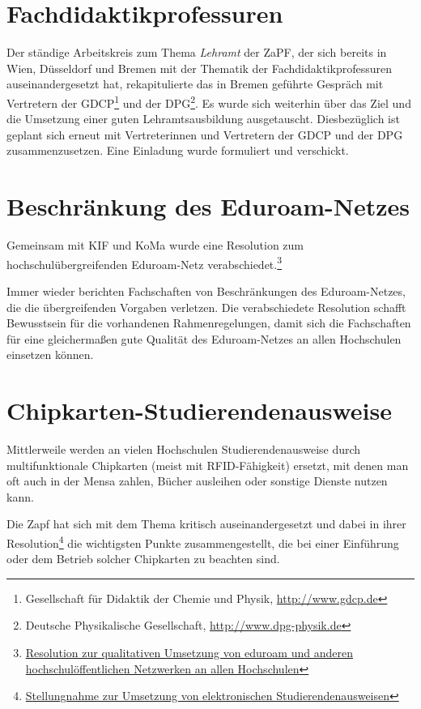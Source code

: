 \section*{Fachdidaktikprofessuren}

Der  ständige  Arbeitskreis zum Thema \emph{Lehramt} der ZaPF, der sich bereits 
in Wien, Düsseldorf und Bremen mit  der Thematik der Fachdidaktikprofessuren
auseinandergesetzt hat, rekapitulierte das in Bremen geführte Gespräch mit
Vertretern der GDCP\footnote{Gesellschaft für Didaktik der Chemie und Physik,
\href{http://www.gdcp.de}{\url{http://www.gdcp.de}}} und der DPG\footnote{Deutsche Physikalische Gesellschaft, \href{http://www.dpg-physik.de}{\url{http://www.dpg-physik.de}}}.
Es wurde sich weiterhin über  das Ziel und die Umsetzung einer guten
Lehramtsausbildung ausgetauscht.  Diesbezüglich ist geplant sich erneut mit
Vertreterinnen und Vertretern der GDCP und der DPG zusammenzusetzen.
Eine Einladung wurde formuliert und verschickt.


\section*{Beschränkung des Eduroam-Netzes}

Gemeinsam mit KIF und KoMa wurde eine Resolution zum hochschulübergreifenden
Eduroam-Netz verabschiedet.\footnote{\href{https://vmp.ethz.ch/zapfwiki/images/2/27/Resolution\_SoSe15\_Netzneutralit\%C3\%A4t\_in\_Universit\%C3\%A4tsnetzen.pdf}{Resolution zur qualitativen Umsetzung von eduroam und anderen hochschulöffentlichen Netzwerken an allen Hochschulen}}

Immer wieder berichten Fachschaften von Beschränkungen des Eduroam-Netzes, die
die übergreifenden Vorgaben verletzen. Die verabschiedete Resolution schafft 
Bewusstsein für die vorhandenen Rahmenregelungen, damit sich die Fachschaften
für eine gleichermaßen gute Qualität des Eduroam-Netzes an allen Hochschulen
einsetzen können.

\section*{Chipkarten-Studierendenausweise}

Mittlerweile werden an vielen Hochschulen Studierendenausweise durch
multifunktionale Chipkarten (meist mit RFID-Fähigkeit) ersetzt, mit denen man
oft auch in der Mensa zahlen, Bücher ausleihen oder sonstige Dienste nutzen
kann.

Die Zapf hat sich mit dem Thema kritisch auseinandergesetzt und dabei in ihrer
Resolution\footnote{\href{https://vmp.ethz.ch/zapfwiki/images/4/4a/Resolution\_SoSe15\_Umsetzung\_von\_elektronischen\_Studierendenausweisen.pdf}{Stellungnahme zur Umsetzung von elektronischen Studierendenausweisen}} die wichtigsten Punkte zusammengestellt, die bei einer
Einführung oder dem Betrieb solcher Chipkarten zu beachten sind.

